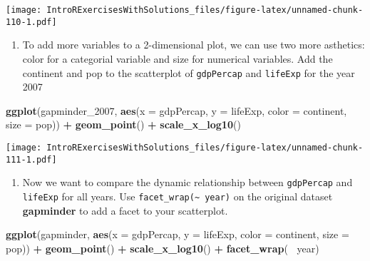 \documentclass[]{article}
\newenvironment{Shaded}{\begin{snugshade}}{\end{snugshade}}
\newcommand{\KeywordTok}[1]{\textcolor[rgb]{0.13,0.29,0.53}{\textbf{#1}}}
\newcommand{\DataTypeTok}[1]{\textcolor[rgb]{0.13,0.29,0.53}{#1}}
\newcommand{\DecValTok}[1]{\textcolor[rgb]{0.00,0.00,0.81}{#1}}
\newcommand{\StringTok}[1]{\textcolor[rgb]{0.31,0.60,0.02}{#1}}
\newcommand{\OperatorTok}[1]{\textcolor[rgb]{0.81,0.36,0.00}{\textbf{#1}}}
\newcommand{\NormalTok}[1]{#1}
\providecommand{\tightlist}{%
  \setlength{\itemsep}{0pt}\setlength{\parskip}{0pt}}
\begin{document}
\texttt{[image: IntroRExercisesWithSolutions\_files/figure-latex/unnamed-chunk-110-1.pdf]}

\begin{enumerate}
\def\labelenumi{\arabic{enumi}.}
\setcounter{enumi}{5}
\tightlist
\item
  To add more variables to a 2-dimensional plot, we can use two more
  asthetics: color for a categorial variable and size for numerical
  variables. Add the continent and pop to the scatterplot of
  \texttt{gdpPercap} and \texttt{lifeExp} for the year 2007
\end{enumerate}

\begin{Shaded}
\begin{Highlighting}[]
\KeywordTok{ggplot}\NormalTok{(gapminder_}\DecValTok{2007}\NormalTok{, }\KeywordTok{aes}\NormalTok{(}\DataTypeTok{x =}\NormalTok{ gdpPercap, }\DataTypeTok{y =}\NormalTok{ lifeExp, }\DataTypeTok{color =}\NormalTok{ continent, }\DataTypeTok{size =}\NormalTok{ pop)) }\OperatorTok{+}
\StringTok{  }\KeywordTok{geom_point}\NormalTok{() }\OperatorTok{+}
\StringTok{  }\KeywordTok{scale_x_log10}\NormalTok{()}
\end{Highlighting}
\end{Shaded}

\texttt{[image: IntroRExercisesWithSolutions\_files/figure-latex/unnamed-chunk-111-1.pdf]}

\begin{enumerate}
\def\labelenumi{\arabic{enumi}.}
\setcounter{enumi}{6}
\tightlist
\item
  Now we want to compare the dynamic relationship between
  \texttt{gdpPercap} and \texttt{lifeExp} for all years. Use
  \texttt{facet\_wrap(\textasciitilde{}\ year)} on the original dataset
  \textbf{gapminder} to add a facet to your scatterplot.
\end{enumerate}

\begin{Shaded}
\begin{Highlighting}[]
\KeywordTok{ggplot}\NormalTok{(gapminder, }\KeywordTok{aes}\NormalTok{(}\DataTypeTok{x =}\NormalTok{ gdpPercap, }\DataTypeTok{y =}\NormalTok{ lifeExp, }\DataTypeTok{color =}\NormalTok{ continent, }\DataTypeTok{size =}\NormalTok{ pop)) }\OperatorTok{+}
\StringTok{  }\KeywordTok{geom_point}\NormalTok{() }\OperatorTok{+}
\StringTok{  }\KeywordTok{scale_x_log10}\NormalTok{() }\OperatorTok{+}
\StringTok{  }\KeywordTok{facet_wrap}\NormalTok{(}\OperatorTok{~}\StringTok{ }\NormalTok{year)}
\end{Highlighting}
\end{Shaded}
\end{document}

